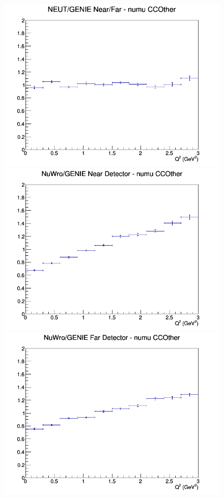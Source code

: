\begin{figure}[h]
\endminipage
{}
\includegraphics[width=\linewidth]{Q2/nominal/ratios/CCOther_NEUT_GENIE_numu_NF_Q2.png}
\endminipage
\newline
{}
\includegraphics[width=\linewidth]{Q2/nominal/ratios/CCOther_NuWro_GENIE_numu_near_Q2.png}
\endminipage
{}
\includegraphics[width=\linewidth]{Q2/nominal/ratios/CCOther_NuWro_GENIE_numu_far_Q2.png}

\end{figure}
